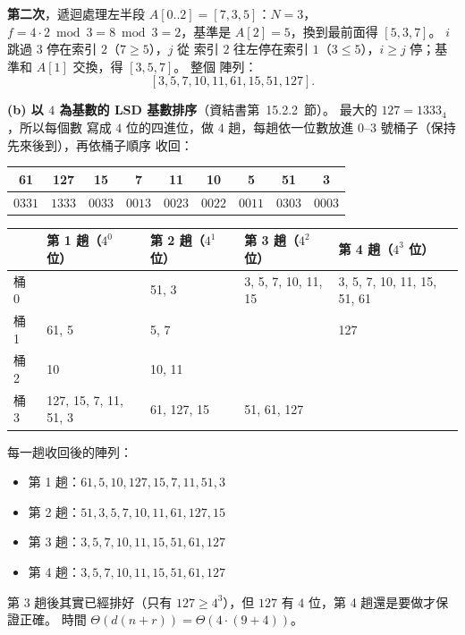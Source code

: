 \begin{pastsoln}
\textbf{第二次}，遞迴處理左半段 $A[0..2] = [7, 3, 5]$：$N = 3$，$f = 4 \cdot 2 \bmod 3 = 8 \bmod 3 =
2$，基準是 $A[2] = 5$，換到最前面得 $[5, 3, 7]$。 $i$ 跳過 $3$ 停在索引 $2$（$7 \ge 5$），$j$ 從
索引 $2$ 往左停在索引 $1$（$3 \le 5$），$i \ge j$ 停；基準和 $A[1]$ 交換，得 $[3, 5, 7]$。 整個
陣列：
\[
[3, 5, 7, 10, 11, 61, 15, 51, 127].
\]

\textbf{(b) 以 $4$ 為基數的 LSD 基數排序}（資結書第~15.2.2~節）。 最大的 $127 = 1333_4$，所以每個數
寫成 $4$ 位的四進位，做 $4$ 趟，每趟依一位數放進 $0$--$3$ 號桶子（保持先來後到），再依桶子順序
收回：
\begin{center}
\small
\begin{tabular}{*{9}{c}}
\toprule
61 & 127 & 15 & 7 & 11 & 10 & 5 & 51 & 3 \\
\midrule
$0331$ & $1333$ & $0033$ & $0013$ & $0023$ & $0022$ & $0011$ & $0303$ & $0003$ \\
\bottomrule
\end{tabular}
\end{center}
\begin{center}
\small
\begin{tabular}{lllll}
\toprule
 & 第 1 趟（$4^0$ 位） & 第 2 趟（$4^1$ 位） & 第 3 趟（$4^2$ 位） & 第 4 趟（$4^3$ 位） \\
\midrule
桶 0 & & 51, 3 & 3, 5, 7, 10, 11, 15 & 3, 5, 7, 10, 11, 15, 51, 61 \\
桶 1 & 61, 5 & 5, 7 & & 127 \\
桶 2 & 10 & 10, 11 & & \\
桶 3 & 127, 15, 7, 11, 51, 3 & 61, 127, 15 & 51, 61, 127 & \\
\bottomrule
\end{tabular}
\end{center}
每一趟收回後的陣列：
\begin{itemize}
\item 第 1 趟：$61, 5, 10, 127, 15, 7, 11, 51, 3$
\item 第 2 趟：$51, 3, 5, 7, 10, 11, 61, 127, 15$
\item 第 3 趟：$3, 5, 7, 10, 11, 15, 51, 61, 127$
\item 第 4 趟：$3, 5, 7, 10, 11, 15, 51, 61, 127$
\end{itemize}
第 3 趟後其實已經排好（只有 $127 \ge 4^3$），但 $127$ 有 $4$ 位，第 4 趟還是要做才保證正確。 時間
$\Theta(d(n + r)) = \Theta(4 \cdot (9 + 4))$。
\end{pastsoln}
